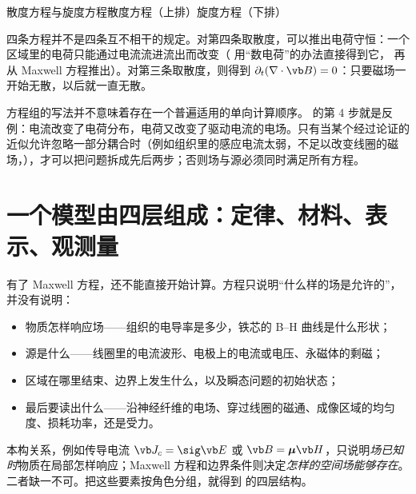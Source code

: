 
\begin{compare}{散度方程与旋度方程}{散度方程（上排）}{旋度方程（下排）}
\end{compare}

四条方程并不是四条互不相干的规定。对第四条取散度，可以推出电荷守恒：一个区域里的电荷只能通过电流流进流出而改变（ 用“数电荷”的办法直接得到它， 再从 Maxwell 方程推出）。对第三条取散度，则得到 $\partial_t(\nabla\cdot\vb B)=0$：只要磁场一开始无散，以后就一直无散。

\begin{pitfall}[“先算 $\vb E$，再算 $\vb D$、$\vb H$，按顺序一路算下去”]
方程组的写法并不意味着存在一个普遍适用的单向计算顺序。 的第 4 步就是反例：电流改变了电荷分布，电荷又改变了驱动电流的电场。只有当某个经过论证的近似允许忽略一部分耦合时（例如组织里的感应电流太弱，不足以改变线圈的磁场，），才可以把问题拆成先后两步；否则场与源必须同时满足所有方程。
\end{pitfall}

\section{一个模型由四层组成：定律、材料、表示、观测量}\label{sec:intro-layers}

有了 Maxwell 方程，还不能直接开始计算。方程只说明“什么样的场是允许的”，并没有说明：
\begin{itemize}
\item 物质怎样响应场——组织的电导率是多少，铁芯的 B--H 曲线是什么形状；
\item 源是什么——线圈里的电流波形、电极上的电流或电压、永磁体的剩磁；
\item 区域在哪里结束、边界上发生什么，以及瞬态问题的初始状态；
\item 最后要读出什么——沿神经纤维的电场、穿过线圈的磁通、成像区域的均匀度、损耗功率，还是受力。
\end{itemize}
本构关系，例如传导电流 $\vb J_c=\sig\vb E$ 或 $\vb B=\boldsymbol\mu\vb H$，只说明\emph{场已知时}物质在局部怎样响应；Maxwell 方程和边界条件则决定\emph{怎样的空间场能够存在}。二者缺一不可。把这些要素按角色分组，就得到 的四层结构。


